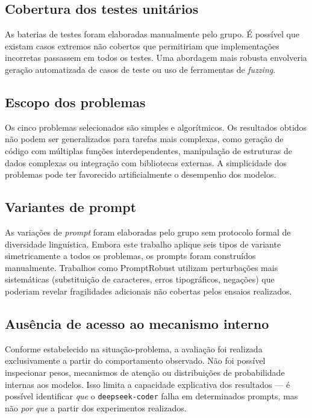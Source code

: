 \documentclass[12pt,
    english,
    french,
    spanish,
    brazil,
    ]{article}
\begin{document}
\subsection{Cobertura dos testes unitários}

As baterias de testes foram elaboradas manualmente pelo grupo. É possível que existam casos extremos não cobertos que permitiriam que implementações incorretas passassem em todos os testes. Uma abordagem mais robusta envolveria geração automatizada de casos de teste ou uso de ferramentas de \textit{fuzzing}.

\subsection{Escopo dos problemas}

Os cinco problemas selecionados são simples e algorítmicos. Os resultados obtidos não podem ser generalizados para tarefas mais complexas, como geração de código com múltiplas funções interdependentes, manipulação de estruturas de dados complexas ou integração com bibliotecas externas. A simplicidade dos problemas pode ter favorecido artificialmente o desempenho dos modelos.

\subsection{Variantes de prompt}

As variações de \textit{prompt} foram elaboradas pelo grupo sem protocolo formal de diversidade linguística. Embora este trabalho aplique seis tipos de variante simetricamente a todos os problemas, os prompts foram construídos manualmente. Trabalhos como PromptRobust \cite{zhu2023promptrobust} utilizam perturbações mais sistemáticas (substituição de caracteres, erros tipográficos, negações) que poderiam revelar fragilidades adicionais não cobertas pelos ensaios realizados.

\subsection{Ausência de acesso ao mecanismo interno}

Conforme estabelecido na situação-problema, a avaliação foi realizada exclusivamente a partir do comportamento observado. Não foi possível inspecionar pesos, mecanismos de atenção ou distribuições de probabilidade internas aos modelos. Isso limita a capacidade explicativa dos resultados — é possível identificar \textit{que} o \texttt{deepseek-coder} falha em determinados prompts, mas não \textit{por que} a partir dos experimentos realizados.
\end{document}
